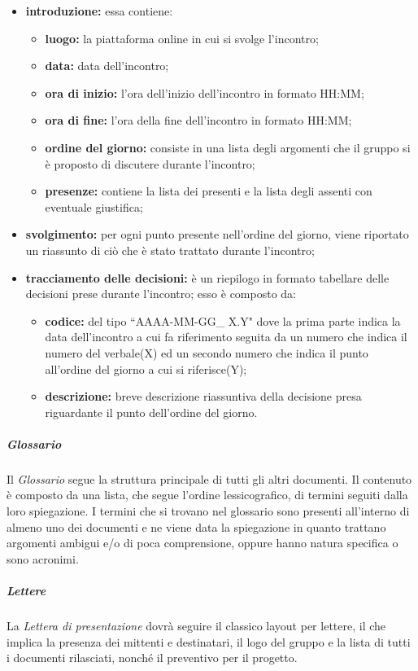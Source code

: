 				\begin{itemize}
						\item \textbf{introduzione:} essa contiene:
							\begin{itemize}
								\item \textbf{luogo:} la piattaforma online in cui si svolge l'incontro;
								\item \textbf{data:} data dell'incontro;
								\item \textbf{ora di inizio:} l'ora dell'inizio dell'incontro in formato HH:MM;
								\item \textbf{ora di fine:} l'ora della fine dell'incontro in formato HH:MM;
								\item \textbf{ordine del giorno:} consiste in una lista degli argomenti che il gruppo si è proposto di discutere durante l'incontro;
								\item \textbf{presenze:} contiene la lista dei presenti e la lista degli assenti con eventuale giustifica;
							\end{itemize}
							\item \textbf{svolgimento:} per ogni punto presente nell'ordine del giorno, viene riportato un riassunto di ciò che è stato trattato durante l'incontro;
							\item \textbf{tracciamento delle decisioni:} è un riepilogo in formato tabellare delle decisioni prese durante l'incontro; esso è composto da:
							\begin{itemize}
								\item \textbf{codice:} del tipo ``AAAA-MM-GG\_ X.Y" dove la prima parte indica la data dell'incontro a cui fa riferimento seguita da un numero che indica il numero del verbale(X) ed un secondo numero che indica il punto all'ordine del giorno a cui si riferisce(Y);
								\item{ \textbf{descrizione:} breve descrizione riassuntiva della decisione presa riguardante il punto dell'ordine del giorno.}
								\end{itemize}
					\end{itemize}
				\subparagraph{Glossario}
				Il \textit{Glossario} segue la struttura principale di tutti gli altri documenti. Il contenuto è composto da una lista, che segue l'ordine lessicografico, di termini seguiti dalla loro spiegazione. I termini che si trovano nel glossario sono presenti all'interno di almeno uno dei documenti e ne viene data la spiegazione in quanto trattano argomenti ambigui e/o di poca comprensione, oppure hanno natura specifica o sono acronimi. 
				\subparagraph{Lettere}
				La \textit{Lettera di presentazione} dovrà seguire il classico layout per lettere, il che implica la presenza dei mittenti e destinatari, il logo del gruppo e la lista di tutti i documenti rilasciati, nonché il preventivo per il progetto.
